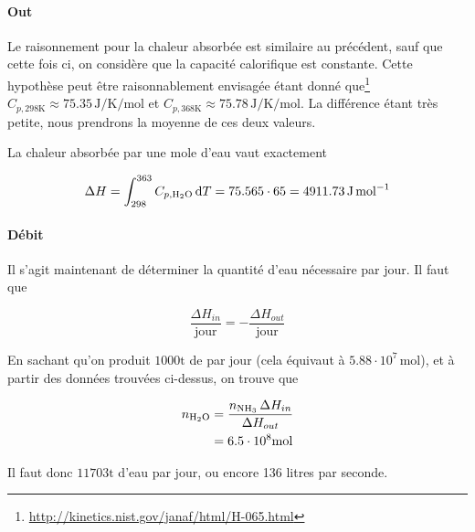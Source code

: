 \documentclass[a4paper, oneside, 12pt]{article}
\begin{document}
\paragraph{Out}

Le raisonnement pour la chaleur absorbée est similaire 
au précédent, sauf que cette fois ci, 
on considère que la capacité calorifique est constante.
Cette hypothèse peut être raisonnablement envisagée 
étant donné que\footnote{\url{http://kinetics.nist.gov/janaf/html/H-065.html}} 
$C_{p, 298 \si{\kelvin}} \approx 75.35 \, \si{\joule\per\kelvin\per\mole}$ 
et $C_{p, 368 \si{\kelvin}} \approx 75.78 \, \si{\joule\per\kelvin\per\mole}$.
La différence étant très petite, 
nous prendrons la moyenne de ces deux valeurs. 

La chaleur absorbée par une mole d'eau vaut exactement

\begin{equation}
	\Delta H = \int_{298}^{363} C_{p, \ce{H2O}} \, \dif{T}
	= 75.565 \cdot 65 = 4911.73 \, \si{\joule\per\mole}
\end{equation}

\paragraph{Débit}

Il s'agit maintenant de déterminer la quantité d'eau nécessaire par jour.
Il faut que

\[
	\frac{\Delta H_{in}}{\mathrm{jour}} 
	= - \frac{\Delta H_{out}}{\mathrm{jour}}
\]

En sachant qu'on produit $1000 \si{\tonne}$ de  par jour
(cela équivaut à $5.88 \cdot 10^7 \, \si{\mole}$),
et à partir des données trouvées ci-dessus, 
on trouve que

\begin{align*}
	n_{\ce{H2O}} &= \frac{n_{\ce{NH3}} \, \Delta H_{in}}{\Delta H_{out}} \\
	&= 6.5 \cdot 10^8 \si{\mole} 
\end{align*}

Il faut donc $11703 \si{\tonne}$ d'eau par jour, 
ou encore 136 litres par seconde.
\end{document}
